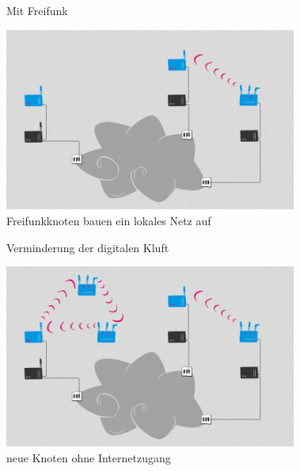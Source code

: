\documentclass[10pt]{beamer}
\begin{document}
    \begin{frame}{Mit Freifunk}
      \begin{center}
        \includegraphics[height=6cm]{images/network_2}\\
        \vspace{1em}
        Freifunkknoten bauen ein lokales Netz auf
        \vspace{1em}
      \end{center}
    \end{frame}

    \begin{frame}{Verminderung der digitalen Kluft}
      \begin{center}
        \includegraphics[height=6cm]{images/network_3}\\
        \vspace{1em}
        neue Knoten ohne Internetzugang
        \vspace{1em}
      \end{center}
    \end{frame}
\end{document}
